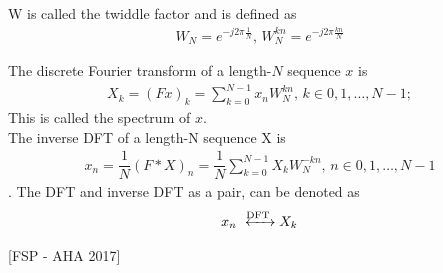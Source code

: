 W is called the twiddle factor and is defined as 
\begin{align*}
	W_N = e^{-j 2 \pi\frac{1}{N}}, \, W_N^{kn} = e^{-j 2 \pi\frac{kn}{N}}
\end{align*}

\begin{definition}
The discrete Fourier transform of a length-$N$ sequence $x$ is 
\begin{align*}
	X_k = (Fx)_k = \sum_{k=0}^{N-1} x_n W_N^{kn}, \, k\in {0, 1, \dots, N-1};
\end{align*}
This is called the spectrum of $x$.\\
The inverse DFT of a length-N sequence X is
\begin{align*}
	x_n = \dfrac{1}{N}(F*X)_n = \dfrac{1}{N}\sum_{k=0}^{N-1} X_k W_N^{-kn}, \, n \in {0, 1, \dots, N-1}
\end{align*}
.
The DFT and inverse DFT as a pair, can be denoted as 
\begin{align*}
	x_n \xleftrightarrow{\text{DFT}} X_k
\end{align*}
\end{definition} [FSP - AHA 2017]